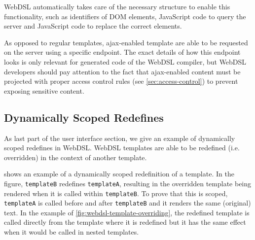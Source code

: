       WebDSL automatically takes care of the necessary structure to enable this functionality, such as identifiers of DOM elements, JavaScript code to query the server and JavaScript code to replace the correct elements.

      As opposed to regular templates, ajax-enabled template are able to be requested on the server using a specific endpoint. The exact details of how this endpoint looks is only relevant for generated code of the WebDSL compiler, but WebDSL developers should pay attention to the fact that ajax-enabled content must be projected with proper access control rules (see \cref{sec:access-control}) to prevent exposing sensitive content.

    \subsection{\label{subsec:redefines}Dynamically Scoped Redefines}

      As last part of the user interface section, we give an example of dynamically scoped redefines in WebDSL. WebDSL templates are able to be redefined (i.e. overridden) in the context of another template.

       shows an example of a dynamically scoped redefinition of a template. In the figure, \texttt{templateB} redefines \texttt{templateA}, resulting in the overridden template being rendered when it is called within \texttt{templateB}. To prove that this is scoped, \texttt{templateA} is called before and after \texttt{templateB} and it renders the same (original) text. In the example of \cref{fig:webdsl-template-overriding}, the redefined template is called directly from the template where it is redefined but it has the same effect when it would be called in nested templates.

